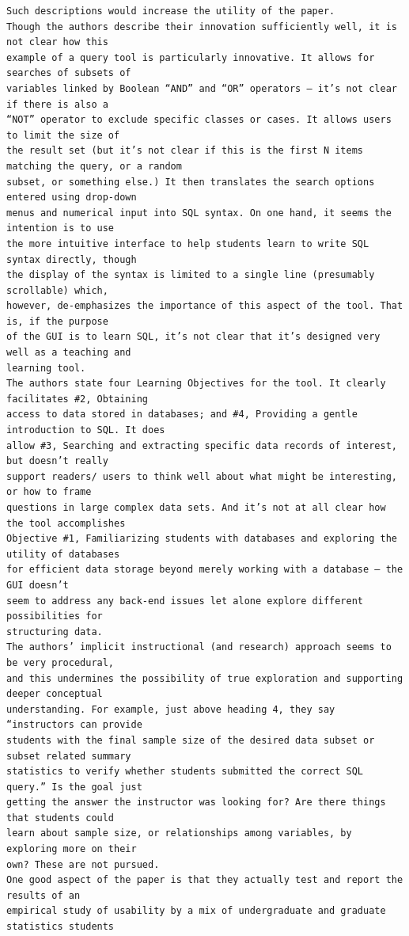 \documentclass[11pt]{tise_style}
\begin{document}
\begin{verbatim}
Such descriptions would increase the utility of the paper.
Though the authors describe their innovation sufficiently well, it is not clear how this
example of a query tool is particularly innovative. It allows for searches of subsets of
variables linked by Boolean “AND” and “OR” operators – it’s not clear if there is also a
“NOT” operator to exclude specific classes or cases. It allows users to limit the size of
the result set (but it’s not clear if this is the first N items matching the query, or a random
subset, or something else.) It then translates the search options entered using drop-down
menus and numerical input into SQL syntax. On one hand, it seems the intention is to use
the more intuitive interface to help students learn to write SQL syntax directly, though
the display of the syntax is limited to a single line (presumably scrollable) which,
however, de-emphasizes the importance of this aspect of the tool. That is, if the purpose
of the GUI is to learn SQL, it’s not clear that it’s designed very well as a teaching and
learning tool.
The authors state four Learning Objectives for the tool. It clearly facilitates #2, Obtaining
access to data stored in databases; and #4, Providing a gentle introduction to SQL. It does
allow #3, Searching and extracting specific data records of interest, but doesn’t really
support readers/ users to think well about what might be interesting, or how to frame
questions in large complex data sets. And it’s not at all clear how the tool accomplishes
Objective #1, Familiarizing students with databases and exploring the utility of databases
for efficient data storage beyond merely working with a database — the GUI doesn’t
seem to address any back-end issues let alone explore different possibilities for
structuring data.
The authors’ implicit instructional (and research) approach seems to be very procedural,
and this undermines the possibility of true exploration and supporting deeper conceptual
understanding. For example, just above heading 4, they say “instructors can provide
students with the final sample size of the desired data subset or subset related summary
statistics to verify whether students submitted the correct SQL query.” Is the goal just
getting the answer the instructor was looking for? Are there things that students could
learn about sample size, or relationships among variables, by exploring more on their
own? These are not pursued.
One good aspect of the paper is that they actually test and report the results of an
empirical study of usability by a mix of undergraduate and graduate statistics students

\end{verbatim}
\end{document}
